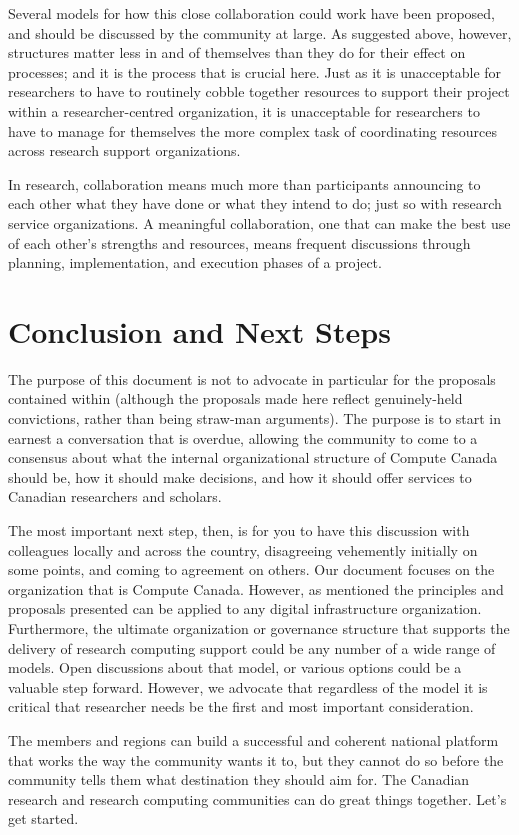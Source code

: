 \documentclass[11pt, letterpaper, twoside]{article}
\begin{document}
Several models for how this close collaboration could work have been
proposed, and should be discussed by the community at large. As
suggested above, however, structures matter less in and of themselves
than they do for their effect on processes; and it is the process that
is crucial here. Just as it is unacceptable for researchers to have to
routinely cobble together resources to support their project within a
researcher-centred organization, it is unacceptable for researchers to
have to manage for themselves the more complex task of coordinating
resources across research support organizations.

In research, collaboration means much more than participants announcing
to each other what they have done or what they intend to do; just so
with research service organizations. A meaningful collaboration, one
that can make the best use of each other's strengths and resources,
means frequent discussions through planning, implementation, and
execution phases of a project.

\section*{Conclusion and Next Steps}
%

The purpose of this document is not to advocate in particular for the
proposals contained within (although the proposals made here reflect
genuinely-held convictions, rather than being straw-man arguments). The
purpose is to start in earnest a conversation that is overdue, allowing
the community to come to a consensus about what the internal
organizational structure of Compute Canada should be, how it should make
decisions, and how it should offer services to Canadian researchers and
scholars.

The most important next step, then, is for you to have this discussion
with colleagues locally and across the country, disagreeing vehemently
initially on some points, and coming to agreement on others. 
Our document focuses on the organization that is Compute Canada.
However, as mentioned the principles and proposals presented can be
applied to any digital infrastructure organization. Furthermore, the
ultimate organization or governance structure that supports the delivery
of research computing support could be any number of a wide range of
models. Open discussions about that model, or various options could be a
valuable step forward. However, we advocate that regardless of the model
it is critical that researcher needs be the first and most important
consideration.

The members and regions can build a successful and coherent national
platform that works the way the community wants it to, but they cannot
do so before the community tells them what destination they should aim
for. The Canadian research and research computing communities can do
great things together. Let's get started.

\newpage


%


\clearpage

\makebackcover
\end{document}
